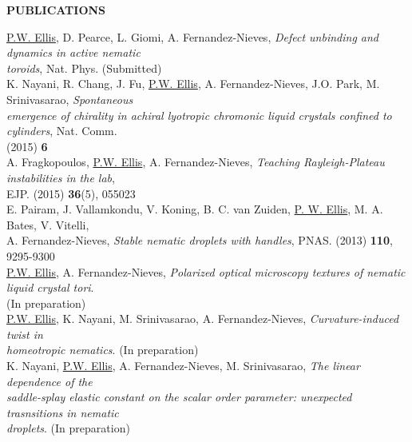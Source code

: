 \documentclass[10pt]{article}
\newenvironment{changemargin}[2]{%
  \list{}{\rightmargin#2\leftmargin#1
    \parsep=0pt\topsep=1pt\partopsep=0pt}
\item[]} {\endlist}
\newenvironment{indentmore}{\begin{changemargin}{10pt}{0cm}}{\end{changemargin}}
\begin{document}
\textbf{\large PUBLICATIONS}
\begin{indentmore}
\underline{P.W. Ellis}, D. Pearce, L. Giomi, A. Fernandez-Nieves, \emph{Defect unbinding and dynamics in active nematic \\ \hspace*{15pt} toroids}, Nat. Phys. (Submitted) \\

K. Nayani, R. Chang, J. Fu, \underline{P.W. Ellis}, A. Fernandez-Nieves, J.O. Park, M. Srinivasarao, \emph{Spontaneous \\ \hspace*{15pt} emergence of chirality in achiral lyotropic chromonic liquid crystals confined to cylinders}, Nat. Comm. \\ \hspace*{15pt}  (2015) {\bf 6} \\

A. Fragkopoulos, \underline{P.W. Ellis}, A. Fernandez-Nieves, \emph{Teaching Rayleigh-Plateau instabilities in the lab}, \\ \hspace*{15pt}EJP. (2015) {\bf 36}(5), 055023 \\

E. Pairam, J. Vallamkondu, V. Koning, B. C. van Zuiden, \underline{P. W. Ellis}, M. A. Bates, V. Vitelli, \\ \hspace*{15pt}A. Fernandez-Nieves, \emph{Stable nematic droplets with handles}, PNAS. (2013) {\bf 110}, 9295-9300\\

\underline{P.W. Ellis}, A. Fernandez-Nieves, \emph{Polarized optical microscopy textures of nematic liquid crystal tori}. \\ \hspace*{15pt} (In preparation)\\

\underline{P.W. Ellis}, K. Nayani, M. Srinivasarao, A. Fernandez-Nieves, \emph{Curvature-induced twist in \\ \hspace*{15pt} homeotropic nematics}. (In preparation)\\

K. Nayani, \underline{P.W. Ellis}, A. Fernandez-Nieves, M. Srinivasarao, \emph{The linear dependence of the \\ \hspace*{15pt} saddle-splay elastic constant on the scalar order parameter: unexpected trasnsitions in nematic \\ \hspace*{15pt} droplets}. (In preparation)
\end{indentmore}
\end{document}
